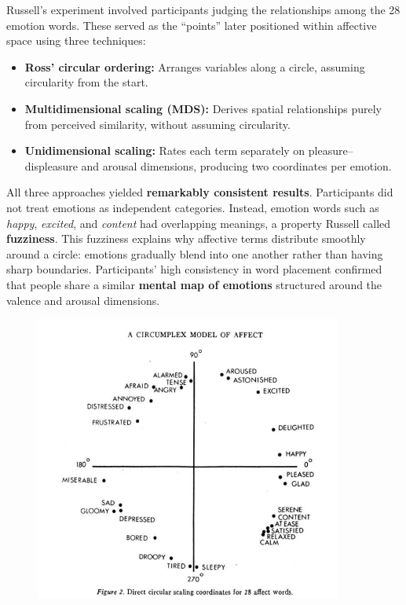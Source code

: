 \documentclass[12pt]{article}
\begin{document}
\vspace{1em}
\noindent
Russell’s experiment involved participants judging the relationships among the 28 emotion words. These served as the “points” later positioned within affective space using three techniques:
\begin{itemize}
    \item \textbf{Ross' circular ordering:} Arranges variables along a circle, assuming circularity from the start.
    \item \textbf{Multidimensional scaling (MDS):} Derives spatial relationships purely from perceived similarity, without assuming circularity.
    \item \textbf{Unidimensional scaling:} Rates each term separately on pleasure–displeasure and arousal dimensions, producing two coordinates per emotion.
\end{itemize}

All three approaches yielded \textbf{remarkably consistent results}. Participants did not treat emotions as independent categories. Instead, emotion words such as \textit{happy}, \textit{excited}, and \textit{content} had overlapping meanings, a property Russell called \textbf{fuzziness}. This fuzziness explains why affective terms distribute smoothly around a circle: emotions gradually blend into one another rather than having sharp boundaries. Participants’ high consistency in word placement confirmed that people share a similar \textbf{mental map of emotions} structured around the valence and arousal dimensions.

\begin{figure}[H]
    \centering
    \includegraphics[width=0.9\textwidth]{Media/affect28circle.png}
\end{figure}
\end{document}
